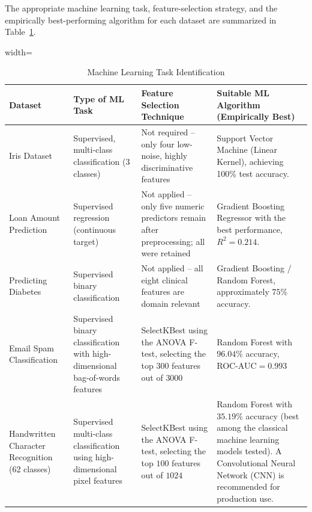\documentclass[12pt,a4paper]{article}
\begin{document}
The appropriate machine learning task, feature-selection strategy, and the
empirically best-performing algorithm for each dataset are summarized in
Table~\ref{tab:ml_tasks}.

\begin{table}[H]
\centering
\caption{Machine Learning Task Identification}
\label{tab:ml_tasks}

\renewcommand{\arraystretch}{1.4}

\begin{adjustbox}{width=\textwidth}
\begin{tabular}{>{\raggedright\arraybackslash}p{3cm}
                >{\raggedright\arraybackslash}p{4cm}
                >{\raggedright\arraybackslash}p{4.2cm}
                >{\raggedright\arraybackslash}p{4.5cm}}
\toprule

\textbf{Dataset} &
\textbf{Type of ML Task} &
\textbf{Feature Selection Technique} &
\textbf{Suitable ML Algorithm (Empirically Best)} \\

\midrule

Iris Dataset &
Supervised, multi-class classification (3 classes) &
Not required -- only four low-noise, highly discriminative features &
Support Vector Machine (Linear Kernel), achieving 100\% test accuracy. \\

\midrule

Loan Amount Prediction &
Supervised regression (continuous target) &
Not applied -- only five numeric predictors remain after preprocessing; all were retained &
Gradient Boosting Regressor with the best performance,
$R^2 = 0.214$. \\

\midrule

Predicting Diabetes &
Supervised binary classification &
Not applied -- all eight clinical features are domain relevant &
Gradient Boosting / Random Forest,
approximately $75\%$ accuracy. \\

\midrule

Email Spam Classification &
Supervised binary classification with high-dimensional bag-of-words features &
SelectKBest using the ANOVA F-test, selecting the top $300$ features out of $3000$ &
Random Forest with
$96.04\%$ accuracy, ROC-AUC$=0.993$ \\

\midrule

Handwritten Character Recognition
(62 classes) &
Supervised multi-class classification using high-dimensional pixel features &
SelectKBest using the ANOVA F-test, selecting the top $100$ features out of $1024$ &
Random Forest with $35.19\%$ accuracy (best among the classical machine learning models tested). A Convolutional Neural Network (CNN) is recommended for production use. \\

\bottomrule
\end{tabular}
\end{adjustbox}
\end{table}
\end{document}
